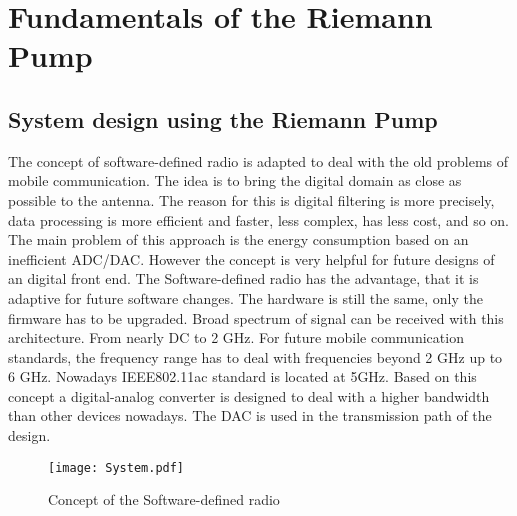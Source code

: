 \chapter{Fundamentals of the Riemann Pump}
\label{ch:fundamentals}
\section{System design using the Riemann Pump}
The concept of software-defined radio is adapted to deal with the old problems of mobile communication. 
The idea is to bring the digital domain as close as possible to the antenna. 
The reason for this is digital filtering is more precisely, data processing is more efficient and faster, less complex, has less cost, and so on. 
The main problem of this approach is the energy consumption based on an inefficient ADC/DAC.
 However the concept is very helpful for future designs of an digital front end.
 The Software-defined radio has the advantage, that it is adaptive for future software changes.
 The hardware is still the same, only the firmware has to be upgraded.
 Broad spectrum of signal can be received with this architecture.
 From nearly DC to 2 GHz. 
 For future mobile communication standards, the frequency range has to deal with frequencies beyond 2 GHz up to 6 GHz. 
 Nowadays IEEE802.11ac standard is located at 5GHz.
  Based on this concept a digital-analog converter is designed to deal with a higher bandwidth than other devices nowadays. 
  The DAC is used in the transmission path of the design.

\begin{figure}[ht]
	\centering
  \texttt{[image: System.pdf]}
	\caption{Concept of the Software-defined radio}
	\label{fig:System}
\end{figure}

